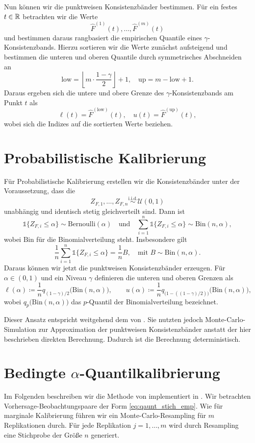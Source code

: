 Nun können wir die punktweisen Konsistenzbänder bestimmen. Für ein festes $t \in \mathbb{R}$ betrachten wir die Werte
\[
\hat{F}^{(1)}(t),\dots,\hat{F}^{(m)}(t)
\]
und bestimmen daraus rangbasiert die empirischen Quantile eines $\gamma$-Konsistenzbands. Hierzu sortieren wir die Werte zunächst aufsteigend und bestimmen die unteren und oberen Quantile durch symmetrisches Abschneiden an
\[
\mathrm{low}=\left\lfloor m\cdot\frac{1-\gamma}{2}\right\rfloor+1,
\quad
\mathrm{up}=m-\mathrm{low}+1.\]
Daraus ergeben sich die untere und obere Grenze des $\gamma$-Konsistenzbands am Punkt $t$ als
\[
\ell(t)=\hat F^{(\mathrm{low})}(t),
\quad
u(t)=\hat F^{(\mathrm{up})}(t),\]
wobei sich die Indizes auf die sortierten Werte beziehen.


\section{Probabilistische Kalibrierung} \label{seq:consist_pit}
Für Probabilistische Kalibrierung erstellen wir die Konsistenzbänder unter der Voraussetzung, dass die \[Z_{F,1}, \dots, Z_{F,n} \overset{\text{i.i.d.}}{\sim} \mathcal{U}(0,1)\] unabhängig und identisch stetig gleichverteilt sind. Dann ist
\[
\mathds{1}\{Z_{F,i} \le \alpha\} \sim \mathrm{Bernoulli}(\alpha) \quad \text{und} \quad
\sum_{i=1}^{n} \mathds{1}\{Z_{F,i} \le \alpha\} \sim \mathrm{Bin}(n,\alpha),
\]
wobei $\mathrm{Bin}$ für die Binomialverteilung steht. Insbesondere gilt
\[
\frac{1}{n}\sum_{i=1}^{n} \mathds{1}\{Z_{F,i} \le \alpha\}
= \frac{1}{n} B, \quad \text{mit } B \sim \mathrm{Bin}(n,\alpha).
\]
Daraus können wir jetzt die punktweisen Konsistenzbänder erzeugen. Für $\alpha \in (0,1)$ und ein Niveau $\gamma$ definieren die unteren und oberen Grenzen als
\[
\ell(\alpha) \coloneqq \frac{1}{n} q_{(1-\gamma)/2}\bigl(\mathrm{Bin}(n,\alpha)\bigr),
\qquad
u(\alpha) \coloneqq   \frac{1}{n} q_{\big(1-((1-\gamma)/2)\big)}\bigl(\mathrm{Bin}(n,\alpha)\bigr),
\]
wobei $q_{p}\bigl(\mathrm{Bin}(n,\alpha)\bigr)$ das $p$-Quantil der Binomialverteilung bezeichnet.

Dieser Ansatz entspricht weitgehend dem von \textcite{gneiting2023regression}. Sie nutzten jedoch Monte-Carlo-Simulation zur Approximation der punktweisen Konsistenzbänder anstatt der hier beschrieben direkten Berechnung. Dadurch ist die Berechnung deterministisch.


\section{\texorpdfstring{Bedingte $\alpha$-Quantilkalibrierung}{Bedingte alpha-Quantilkalibrierung}}
\label{sec:consistent_quant}
Im Folgenden beschreiben wir die Methode von \textcite[B]{gneiting2023regression} implementiert in \textcite{gneiting2023supp}. Wir betrachten Vorhersage-Beobachtungspaare der Form \eqref{eq:qaunt_stich_emp}. Wie für marginale Kalibrierung führen wir ein Monte-Carlo-Resampling für $m$ Replikationen durch. Für jede Replikation $j = 1, \dots, m$ wird durch Resampling eine Stichprobe der Größe $n$ generiert.

